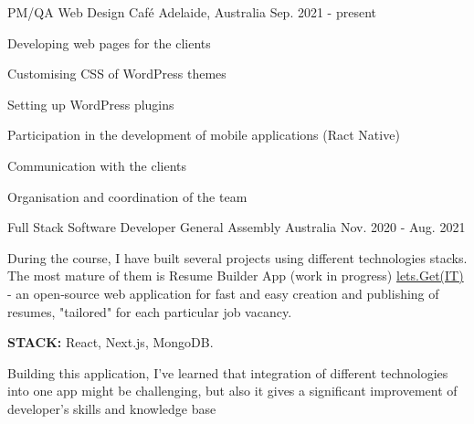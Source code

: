 

\begin{cventries}
  \cventry
    {PM/QA} %
    {Web Design Café} %
    {Adelaide, Australia} %
    {Sep. 2021 - present} %
    {
      \begin{cvitems} 
      \item {Developing web pages for the clients}
      \item {Customising CSS of WordPress themes}
      \item {Setting up WordPress plugins}
      \item {Participation in the development of mobile applications (Ract Native) }
      \item {Communication with the clients}
      \item {Organisation and coordination of the team}
      \end{cvitems}
    }




  \cventry
    {Full Stack Software Developer} %
    {General Assembly} %
    {Australia} %
    {Nov. 2020 - Aug. 2021} %
    {
    {\singlespacing
\begin{cvparagraph}
During the course, I have built several projects using different technologies stacks. The most mature of them is Resume Builder App (work in progress) \textcolor{awesome}{\href{https://github.com/olimstv/resume-builder-app}{lets.Get(IT)}} - an open‐source web application for fast and easy creation and publishing of resumes, "tailored" for each particular job vacancy.
\end{cvparagraph}
\begin{cvparagraph}
\textbf{STACK:} React, Next.js, MongoDB. 
\end{cvparagraph}
\begin{cvparagraph}
Building this application, I've learned that integration of different technologies into one app might be challenging, but also it gives a significant improvement of developer's skills and knowledge base
\end{cvparagraph}
    }
    }



\end{cventries}
